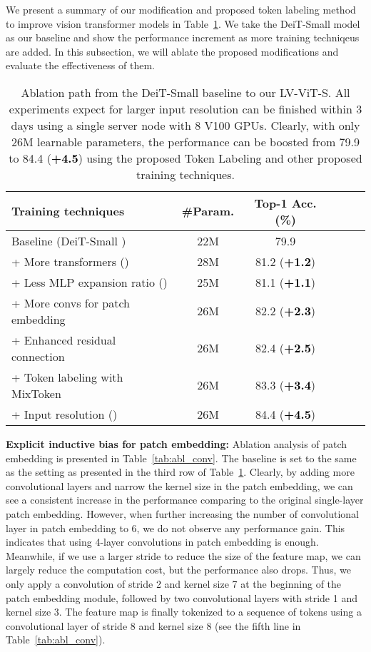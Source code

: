\documentclass{article}
\newcommand{\highlight}[1]{\textcolor{black}{\textbf{#1}}}
\newcommand{\myPara}[1]{\noindent\textbf{#1:}}
\newcommand{\nameofmethod}{LV-ViT}
\begin{document}
We present a summary of our modification and proposed token labeling method to improve vision transformer models in Table~\ref{tab:tricks}.
We take the DeiT-Small \cite{touvron2020training} model as our baseline and show the performance increment as more training techniqeus are added.
In this subsection, we will ablate the proposed modifications and evaluate the effectiveness of them. 
\begin{table}[h]
  \centering
  \small
  \setlength\tabcolsep{1mm}
  \renewcommand\arraystretch{1}
  \caption{Ablation path from the DeiT-Small \cite{touvron2020training} baseline to our \nameofmethod{}-S.
  All experiments expect for larger input resolution can be finished within 3 days using a single server node
  with 8 V100 GPUs. Clearly, with only 26M learnable parameters, the performance can be boosted from 79.9
  to 84.4 (\highlight{+4.5}) using the proposed Token Labeling and other proposed training techniques.}
  \label{tab:tricks}
  \begin{tabular}{lccccc} \toprule[0.5pt]
    Training techniques & \#Param. & Top-1 Acc. (\%) \\ \midrule[0.5pt] \midrule[0.5pt]
    Baseline (DeiT-Small \cite{touvron2020training}) &22M &  79.9\\
    + More transformers () & 28M & 81.2 (\highlight{+1.2}) \\
    + Less MLP expansion ratio () & 25M & 81.1 (\highlight{+1.1})\\
    + More convs for patch embedding &26M& 82.2  (\highlight{+2.3})\\
    + Enhanced residual connection &26M& 82.4
    (\highlight{+2.5}) \\
    + Token labeling with MixToken &26M & 83.3
    (\highlight{+3.4})\\
    + Input resolution () & 26M & 84.4 (\highlight{+4.5})\\
    \bottomrule[0.5pt]
  \end{tabular}
\end{table}

\myPara{Explicit inductive bias for patch embedding}
Ablation analysis of patch embedding is presented in Table~\ref{tab:abl_conv}. 
The baseline is set to the same as the setting as presented in the third row of Table~\ref{tab:tricks}.
Clearly, by adding more convolutional layers and narrow the kernel size in the patch embedding,
we can see a consistent increase in the performance comparing to the original single-layer patch embedding.
However, when further increasing the number of convolutional layer in patch embedding to 6, 
we do not observe any performance gain.
This indicates that using 4-layer convolutions in patch embedding is enough.
Meanwhile, if we use a larger stride to reduce the size of the feature map,
we can largely reduce the computation cost, but the performance also drops. 
Thus, we only apply a convolution of stride 2 and kernel size 7 at the beginning of 
the patch embedding module, followed by two convolutional layers with stride 1 and kernel size 3.
The feature map is finally tokenized to a sequence of tokens using a convolutional layer of stride 8 
and kernel size 8 (see the fifth line in Table~\ref{tab:abl_conv}).
\end{document}
